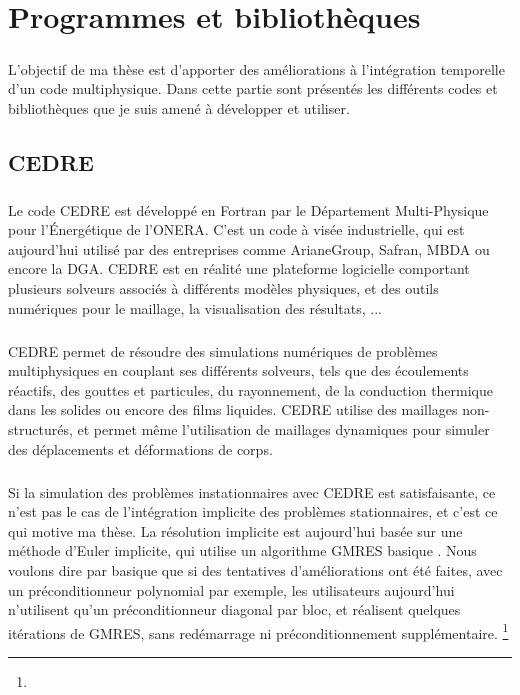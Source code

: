 \chapter{Programmes et bibliothèques}

\paragraph{}
L'objectif de ma thèse est d'apporter des améliorations à l'intégration temporelle d'un code multiphysique.
Dans cette partie sont présentés les différents codes et bibliothèques que je suis amené à développer et utiliser.

\section{CEDRE}

  \paragraph{}
  Le code CEDRE est développé en Fortran par le Département Multi-Physique pour l'Énergétique de l'ONERA.
  C'est un code à visée industrielle, qui est aujourd'hui utilisé par des entreprises comme ArianeGroup, Safran, MBDA ou encore la DGA.
  CEDRE est en réalité une plateforme logicielle comportant plusieurs solveurs associés à différents modèles physiques, et des outils numériques pour le maillage, la visualisation des résultats, ...

  \paragraph{}
  CEDRE permet de résoudre des simulations numériques de problèmes multiphysiques en couplant ses différents solveurs, tels que des écoulements réactifs, des gouttes et particules, du rayonnement, de la conduction thermique dans les solides ou encore des films liquides.
  CEDRE utilise des maillages non-structurés, et permet même l'utilisation de maillages dynamiques pour simuler des déplacements et déformations de corps.

  \paragraph{}
  Si la simulation des problèmes instationnaires avec CEDRE est satisfaisante, ce n'est pas le cas de l'intégration implicite des problèmes stationnaires, et c'est ce qui motive ma thèse.
  La résolution implicite est aujourd'hui basée sur une méthode d'Euler implicite, qui utilise un algorithme GMRES basique \cite{Selva1998}.
  Nous voulons dire par basique que si des tentatives d'améliorations ont été faites, avec un préconditionneur polynomial par exemple, les utilisateurs aujourd'hui n'utilisent qu'un préconditionneur diagonal par bloc, et réalisent quelques itérations de GMRES, sans redémarrage ni préconditionnement supplémentaire.
  \footnote{}

